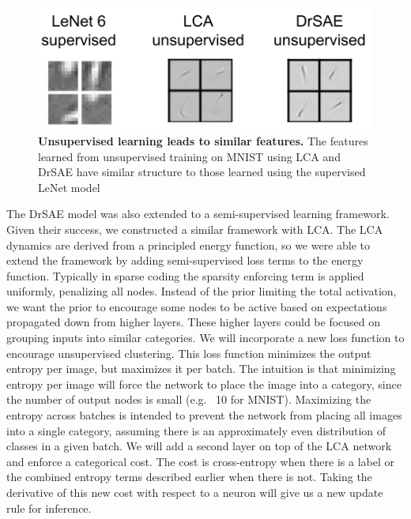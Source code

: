 \begin{figure}\label{fig:ch3_lenet_lca_drsae_weights}
    \centering
    \includegraphics[width=\textwidth]{figures/lenet_lca_drsae_weights.png}
    \caption{\textbf{Unsupervised learning leads to similar features.} The features learned from unsupervised training on MNIST using LCA \parencite{rozell2008sparse} and DrSAE \parencite{rolfe2013discriminative} have similar structure to those learned using the supervised LeNet model \parencite{lecun1998gradient}}
\end{figure}

The DrSAE model was also extended to a semi-supervised learning framework. Given their success, we constructed a similar framework with LCA. The LCA dynamics are derived from a principled energy function, so we were able to extend the framework by adding semi-supervised loss terms to the energy function. Typically in sparse coding the sparsity enforcing term is applied uniformly, penalizing all nodes. Instead of the prior limiting the total activation, we want the prior to encourage some nodes to be active based on expectations propagated down from higher layers. These higher layers could be focused on grouping inputs into similar categories. We will incorporate a new loss function to encourage unsupervised clustering. This loss function minimizes the output entropy per image, but maximizes it per batch. The intuition is that minimizing entropy per image will force the network to place the image into a category, since the number of output nodes is small (e.g. ~10 for MNIST). Maximizing the entropy across batches is intended to prevent the network from placing all images into a single category, assuming there is an approximately even distribution of classes in a given batch. We will add a second layer on top of the LCA network and enforce a categorical cost. The cost is cross-entropy when there is a label or the combined entropy terms described earlier when there is not. Taking the derivative of this new cost with respect to a neuron will give us a new update rule for inference.

